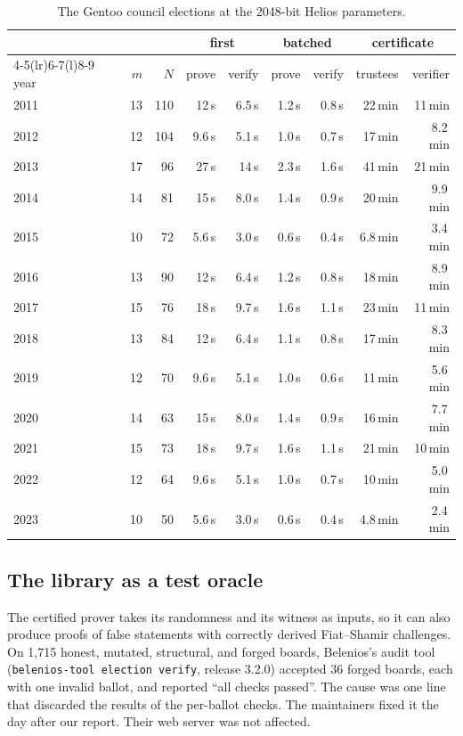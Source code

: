 \begin{table}[t]
  \caption{The Gentoo council elections at the 2048-bit Helios
  parameters.}
  \label{tab:gentoo}
  \centering\scriptsize\setlength{\tabcolsep}{3pt}
  \begin{tabular}{@{}lrrrrrrrr@{}}
    \toprule
    & & & \multicolumn{2}{c}{first} & \multicolumn{2}{c}{batched} & \multicolumn{2}{c}{certificate} \\
    \cmidrule(lr){4-5}\cmidrule(lr){6-7}\cmidrule(l){8-9}
    year & $m$ & $N$ & prove & verify & prove & verify & trustees & verifier \\
    \midrule
    2011 & 13 & 110 & 12\,s & 6.5\,s & 1.2\,s & 0.8\,s & 22\,min & 11\,min \\
    2012 & 12 & 104 & 9.6\,s & 5.1\,s & 1.0\,s & 0.7\,s & 17\,min & 8.2\,min \\
    2013 & 17 & 96 & 27\,s & 14\,s & 2.3\,s & 1.6\,s & 41\,min & 21\,min \\
    2014 & 14 & 81 & 15\,s & 8.0\,s & 1.4\,s & 0.9\,s & 20\,min & 9.9\,min \\
    2015 & 10 & 72 & 5.6\,s & 3.0\,s & 0.6\,s & 0.4\,s & 6.8\,min & 3.4\,min \\
    2016 & 13 & 90 & 12\,s & 6.4\,s & 1.2\,s & 0.8\,s & 18\,min & 8.9\,min \\
    2017 & 15 & 76 & 18\,s & 9.7\,s & 1.6\,s & 1.1\,s & 23\,min & 11\,min \\
    2018 & 13 & 84 & 12\,s & 6.4\,s & 1.1\,s & 0.8\,s & 17\,min & 8.3\,min \\
    2019 & 12 & 70 & 9.6\,s & 5.1\,s & 1.0\,s & 0.6\,s & 11\,min & 5.6\,min \\
    2020 & 14 & 63 & 15\,s & 8.0\,s & 1.4\,s & 0.9\,s & 16\,min & 7.7\,min \\
    2021 & 15 & 73 & 18\,s & 9.7\,s & 1.6\,s & 1.1\,s & 21\,min & 10\,min \\
    2022 & 12 & 64 & 9.6\,s & 5.1\,s & 1.0\,s & 0.7\,s & 10\,min & 5.0\,min \\
    2023 & 10 & 50 & 5.6\,s & 3.0\,s & 0.6\,s & 0.4\,s & 4.8\,min & 2.4\,min \\
    \bottomrule
  \end{tabular}
\end{table}

\subsection{The library as a test oracle}\label{sec:eval:oracle}
The certified prover takes its randomness and its witness as inputs, so
it can also produce proofs of false statements with correctly derived
Fiat--Shamir challenges. On 1{,}715 honest, mutated, structural, and
forged boards, Belenios's audit tool (\texttt{belenios-tool election
verify}, release 3.2.0) accepted 36 forged boards, each with one invalid
ballot, and reported ``all checks passed''. The cause was one line that
discarded the results of the per-ballot checks. The maintainers fixed it
the day after our report. Their web server was not affected. 
